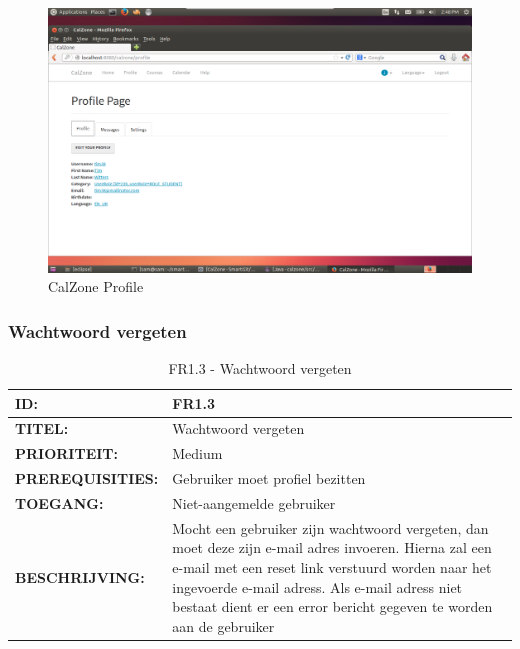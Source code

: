 \begin{center}
\begin{figure}[H]
\caption{CalZone Profile}
\centerline{\includegraphics[scale=0.4]{img/Calzoneprofile}}
\label{fig:CalZone Profile}
\end{figure}
\end{center}

\subsubsection{Wachtwoord vergeten}
\noindent\begin{table}[H]
            \begin{tabular}{l | p{10cm}}
                \textbf{ID:} & FR1.3 \\ \hline
                \textbf{TITEL:} & Wachtwoord vergeten \\ \hline
                \textbf{PRIORITEIT:} &  Medium \\ \hline
                \textbf{PREREQUISITIES:} & Gebruiker moet profiel bezitten\\ \hline
                \textbf{TOEGANG:} &  Niet-aangemelde gebruiker \\ \hline
                \textbf{BESCHRIJVING:} & Mocht een gebruiker zijn wachtwoord vergeten, dan moet deze zijn e-mail adres invoeren. 
                                        Hierna zal een e-mail met een reset link verstuurd worden naar het ingevoerde e-mail adress. 
                                        Als e-mail adress niet bestaat dient er een error bericht gegeven te worden aan de gebruiker\\
            \end{tabular}\\
            \caption{FR1.3 - Wachtwoord vergeten}
            \label{tab:FR1.3 - Wachtwoord vergeten}
        \end{table}

